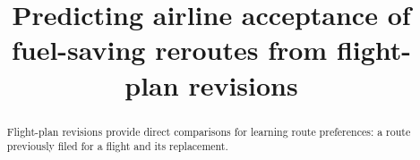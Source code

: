 \documentclass[preprint,authoryear,12pt]{elsarticle}
\begin{document}
\begin{frontmatter}

\title{Predicting airline acceptance of fuel-saving reroutes from
flight-plan revisions}


\begin{abstract}
Flight-plan revisions provide direct comparisons for learning route
preferences: a route previously filed for a flight and its replacement.

\end{abstract}
\end{frontmatter}
\end{document}
